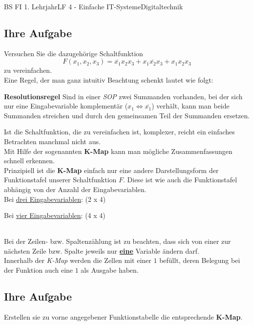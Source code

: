\documentclass[11pt,twocolumn,oneside,openany,headings=optiontotoc,11pt,numbers=noenddot]{article}
\begin{document}
\begin{worksheet}{BS FI 1. Lehrjahr}{LF 4 - Einfache IT-Systeme}{Digitaltechnik}
		\subsection*{Ihre Aufgabe} Versuchen Sie die dazugehörige Schaltfunktion \[F(x_1,x_2,x_3) = \overline{x_1}x_2x_3 + x_1\overline{x_2}x_3 + x_1x_2x_3\] zu vereinfachen.\\
		Eine Regel, der man ganz intuitiv Beachtung schenkt lautet wie folgt:
		\begin{framed}
			\noindent
			\textbf{Resolutionsregel} Sind in einer \textit{SOP} zwei Summanden vorhanden, bei der sich nur eine Eingabevariable komplementär (\(x_1 \Leftrightarrow \overline{x_1}\)) verhält, kann man beide Summanden streichen und durch den gemeinsamen Teil der Summanden ersetzen.\end{framed}
		\noindent
		Ist die Schaltfunktion, die zu vereinfachen ist, komplexer, reicht ein einfaches Betrachten manchmal nicht aus.\\
		Mit Hilfe der sogenannten \textbf{K-Map} kann man mögliche Zusammenfassungen schnell erkennen.\\
		Prinzipiell ist die \textbf{K-Map} einfach nur eine andere Darstellungsform der Funktionstafel unserer Schaltfunktion \(F\). Diese ist wie auch die Funktionstafel abhängig von der Anzahl der Eingabevariablen.\\
		\newpage\noindent
		Bei \underline{drei Eingabevariablen}: (2 x 4)\\
		\begin{karnaugh-map}[4][2][1][$x_2x_1$][$x_3$]
			
		\end{karnaugh-map}
		\par\noindent
		Bei \underline{vier Eingabevariablen}: (4 x 4)\\
		\begin{karnaugh-map}[4][4][1][$x_2x_1$][$x_4x_3$]
			
		\end{karnaugh-map}\\
		Bei der Zeilen- bzw. Spaltenzählung ist zu beachten, dass sich von einer zur nächsten Zeile bzw. Spalte jeweils nur \underline{\textbf{eine}} Variable ändern darf.\\
		Innerhalb der \textit{K-Map} werden die Zellen mit einer \(1\) befüllt, deren Belegung bei der Funktion auch eine \(1\) als Ausgabe haben.
		\subsection*{Ihre Aufgabe}	Erstellen sie zu vorne angegebener Funktionstabelle die entsprechende \textbf{K-Map}.
		

\end{worksheet}
\end{document}
